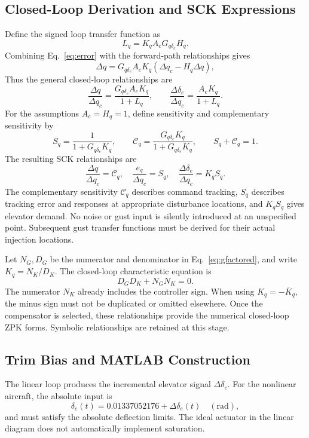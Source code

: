 \documentclass[a4paper,11pt]{article}
\newcommand{\de}{\delta_e}
\newcommand{\Gq}{G_{q\delta_e}}
\begin{document}
\subsection{Closed-Loop Derivation and SCK Expressions}
Define the signed loop transfer function as
\begin{equation}
L_q=K_q A_e\Gq H_q.
\end{equation}
Combining Eq.~\eqref{eq:error} with the forward-path relationships gives
\begin{equation}
\Delta q=\Gq A_eK_q(\Delta q_c-H_q\Delta q),
\end{equation}
Thus the general closed-loop relationships are
\begin{equation}
\frac{\Delta q}{\Delta q_c}=\frac{\Gq A_eK_q}{1+L_q},\qquad
\frac{\Delta\de}{\Delta q_c}=\frac{A_eK_q}{1+L_q}.
\end{equation}
For the assumptions $A_e=H_q=1$, define sensitivity and complementary sensitivity by
\begin{equation}\label{eq:sck}
S_q=\frac{1}{1+\Gq K_q},\qquad
\mathcal C_q=\frac{\Gq K_q}{1+\Gq K_q},\qquad S_q+\mathcal C_q=1.
\end{equation}
The resulting SCK relationships are
\begin{equation}\label{eq:cl}
\boxed{\frac{\Delta q}{\Delta q_c}=\mathcal C_q,\quad
\frac{e_q}{\Delta q_c}=S_q,\quad
\frac{\Delta\de}{\Delta q_c}=K_qS_q.}
\end{equation}
The complementary sensitivity $\mathcal C_q$ describes command tracking, $S_q$ describes tracking error and responses at appropriate disturbance locations, and $K_qS_q$ gives elevator demand. No noise or gust input is silently introduced at an unspecified point. Subsequent gust transfer functions must be derived for their actual injection locations.

Let $N_G,D_G$ be the numerator and denominator in Eq.~\eqref{eq:gfactored}, and write $K_q=N_K/D_K$. The closed-loop characteristic equation is
\begin{equation}
D_GD_K+N_GN_K=0.
\end{equation}
The numerator $N_K$ already includes the controller sign. When using $K_q=-\bar K_q$, the minus sign must not be duplicated or omitted elsewhere. Once the compensator is selected, these relationships provide the numerical closed-loop ZPK forms. Symbolic relationships are retained at this stage.

\subsection{Trim Bias and MATLAB Construction}
The linear loop produces the incremental elevator signal $\Delta\de$. For the nonlinear aircraft, the absolute input is
\begin{equation}
\de(t)=0.01337052176+\Delta\de(t)\quad(\mathrm{rad}),
\end{equation}
and must satisfy the absolute deflection limits. The ideal actuator in the linear diagram does not automatically implement saturation.
\end{document}
